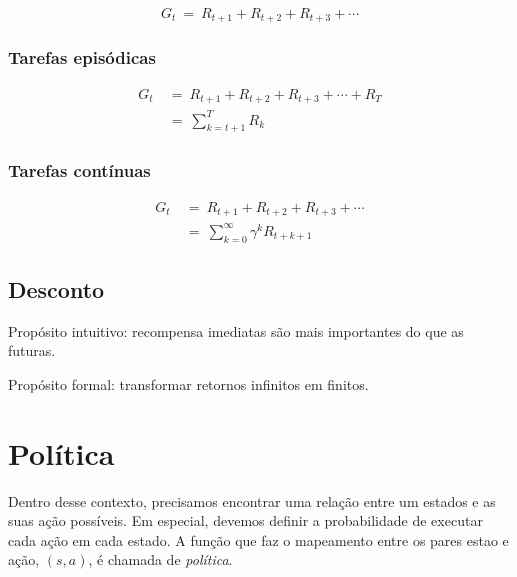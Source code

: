 \documentclass{article}
\begin{document}
            \begin{equation}
                G_t \ = \ R_{t+1} + R_{t+2} + R_{t+3} + \cdots
            \end{equation}

            \subsubsection{Tarefas episódicas}

                \begin{equation}
                \begin{split}
                    G_t & \ = \ R_{t+1} + R_{t+2} + R_{t+3} + \cdots + R_T \\
                    & \ = \ \sum_{k=t+1}^{T} R_k
                \end{split}
                \end{equation}

            \subsubsection{Tarefas contínuas}
        
                \begin{equation}
                \begin{split}
                    G_t & \ = \ R_{t+1} + R_{t+2} + R_{t+3} + \cdots \\
                    & \ = \ \sum_{k=0}^{\infty} \gamma^k R_{t + k + 1}
                \end{split}
                \end{equation}
        
        \subsection{Desconto}
        
            Propósito intuitivo: recompensa imediatas são mais importantes do que as futuras.
            
            Propósito formal: transformar retornos infinitos em finitos.
        
    \section{Política}
    
        Dentro desse contexto, precisamos encontrar uma relação entre um estados e as suas ação possíveis. Em especial, devemos definir a probabilidade de executar cada ação em cada estado. A função que faz o mapeamento entre os pares estao e ação, $(s, a)$, é chamada de \emph{política}. 
        
\end{document}
